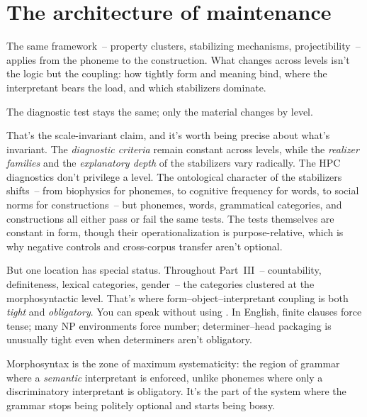 \section{The architecture of maintenance}
\label{sec:14:forward}

The same framework~-- property clusters, stabilizing mechanisms, projectibility~-- applies from the phoneme to the construction. What changes across levels isn't the logic but the coupling: how tightly form and meaning bind, where the interpretant bears the load, and which stabilizers dominate.

The diagnostic test stays the same; only the material changes by level.

That's the scale-invariant claim, and it's worth being precise about what's invariant. The \emph{diagnostic criteria} remain constant across levels, while the \emph{realizer families} and the \emph{explanatory depth} of the stabilizers vary radically. The HPC diagnostics don't privilege a level. The ontological character of the stabilizers shifts~-- from biophysics for phonemes, to cognitive frequency for words, to social norms for constructions~-- but phonemes, words, grammatical categories, and constructions all either pass or fail the same tests. The tests themselves are constant in form, though their operationalization is purpose-relative, which is why negative controls and cross-corpus transfer aren't optional.

But one location has special status. Throughout Part~III~-- countability, definiteness, lexical categories, gender~-- the categories clustered at the morphosyntactic level. That's where form--object--interpretant coupling is both \emph{tight} and \emph{obligatory}. You can speak without using . In English, finite clauses force tense; many NP environments force number; determiner--head packaging is unusually tight even when determiners aren't obligatory.

Morphosyntax is the zone of maximum systematicity: the region of grammar where a \emph{semantic} interpretant is enforced, unlike phonemes where only a discriminatory interpretant is obligatory. It's the part of the system where the grammar stops being politely optional and starts being bossy.


